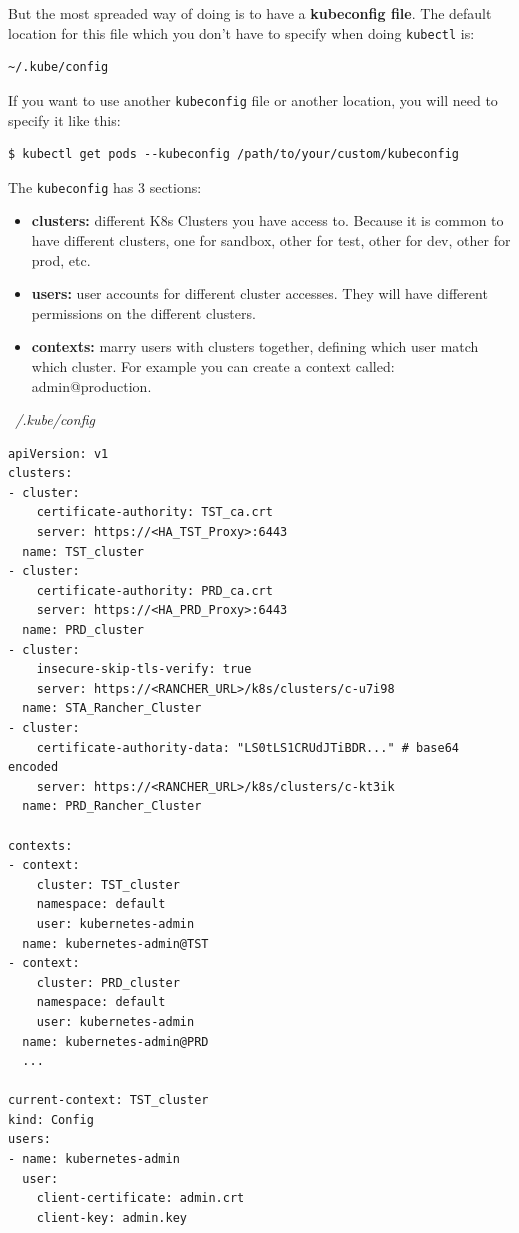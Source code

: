 \documentclass{article}
\newenvironment{codetemplate}[1][]{%
  \mybasecolorbox[#1]
  \itshape
}{%
  \endmybasecolorbox
}
\begin{document}
But the most spreaded way of doing is to have a \textbf{kubeconfig file}. The default location for this file which you don't have to specify when doing \verb|kubectl| is:
\begin{codetemplate}{}
\begin{verbatim}
~/.kube/config
\end{verbatim}
\end{codetemplate}

If you want to use another \verb|kubeconfig| file or another location, you will need to specify it like this:
\begin{codetemplate}{}
\begin{verbatim}
$ kubectl get pods --kubeconfig /path/to/your/custom/kubeconfig
\end{verbatim}
\end{codetemplate}

The \verb|kubeconfig| has 3 sections:
\begin{itemize}
    \item \textbf{clusters:} different K8s Clusters you have access to. Because it is common to have different clusters, one for sandbox, other for test, other for dev, other for prod, etc.
    \item \textbf{users:} user accounts for different cluster accesses. They will have different permissions on the different clusters.
    \item \textbf{contexts:} marry users with clusters together, defining which user match which cluster. For example you can create a context called: admin@production.
\end{itemize}

\begin{codetemplate}{~/.kube/config}
\begin{verbatim}
apiVersion: v1
clusters:
- cluster:
    certificate-authority: TST_ca.crt
    server: https://<HA_TST_Proxy>:6443
  name: TST_cluster
- cluster:
    certificate-authority: PRD_ca.crt
    server: https://<HA_PRD_Proxy>:6443
  name: PRD_cluster
- cluster:
    insecure-skip-tls-verify: true
    server: https://<RANCHER_URL>/k8s/clusters/c-u7i98
  name: STA_Rancher_Cluster
- cluster:
    certificate-authority-data: "LS0tLS1CRUdJTiBDR..." # base64 encoded
    server: https://<RANCHER_URL>/k8s/clusters/c-kt3ik
  name: PRD_Rancher_Cluster

contexts:
- context:
    cluster: TST_cluster
    namespace: default
    user: kubernetes-admin
  name: kubernetes-admin@TST
- context:
    cluster: PRD_cluster
    namespace: default
    user: kubernetes-admin
  name: kubernetes-admin@PRD
  ...

current-context: TST_cluster
kind: Config
users:
- name: kubernetes-admin
  user:
    client-certificate: admin.crt
    client-key: admin.key
\end{verbatim}
\end{codetemplate}
\end{document}
